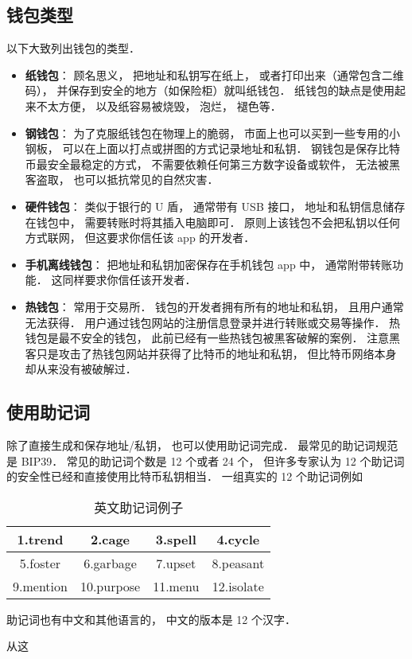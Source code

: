 \subsection{钱包类型}
以下大致列出钱包的类型．
\begin{itemize}
\item \textbf{纸钱包}： 顾名思义， 把地址和私钥写在纸上， 或者打印出来（通常包含二维码）， 并保存到安全的地方（如保险柜）就叫纸钱包． 纸钱包的缺点是使用起来不太方便， 以及纸容易被烧毁， 泡烂， 褪色等．
\item \textbf{钢钱包}： 为了克服纸钱包在物理上的脆弱， 市面上也可以买到一些专用的小钢板， 可以在上面以打点或拼图的方式记录地址和私钥． 钢钱包是保存比特币最安全最稳定的方式， 不需要依赖任何第三方数字设备或软件， 无法被黑客盗取， 也可以抵抗常见的自然灾害．
\item \textbf{硬件钱包}： 类似于银行的 U 盾， 通常带有 USB 接口， 地址和私钥信息储存在钱包中， 需要转账时将其插入电脑即可． 原则上该钱包不会把私钥以任何方式联网， 但这要求你信任该 app 的开发者．
\item \textbf{手机离线钱包}： 把地址和私钥加密保存在手机钱包 app 中， 通常附带转账功能． 这同样要求你信任该开发者．
\item \textbf{热钱包}： 常用于交易所． 钱包的开发者拥有所有的地址和私钥， 且用户通常无法获得． 用户通过钱包网站的注册信息登录并进行转账或交易等操作． 热钱包是最不安全的钱包， 此前已经有一些热钱包被黑客破解的案例． 注意黑客只是攻击了热钱包网站并获得了比特币的地址和私钥， 但比特币网络本身却从来没有被破解过．
\end{itemize}

\subsection{使用助记词}
除了直接生成和保存地址/私钥， 也可以使用助记词完成． 最常见的助记词规范是 BIP39． 常见的助记词个数是 12 个或者 24 个， 但许多专家认为 12 个助记词的安全性已经和直接使用比特币私钥相当． 一组真实的 12 个助记词例如
\begin{table}[ht]
\centering
\caption{英文助记词例子}\label{CryWal_tab1}
\begin{tabular}{|c|c|c|c|}
\hline
1.trend & 2.cage & 3.spell & 4.cycle \\
\hline
5.foster & 6.garbage & 7.upset & 8.peasant \\
\hline
9.mention & 10.purpose & 11.menu & 12.isolate \\
\hline
\end{tabular}
\end{table}
助记词也有中文和其他语言的， 中文的版本是 12 个汉字．

从这

